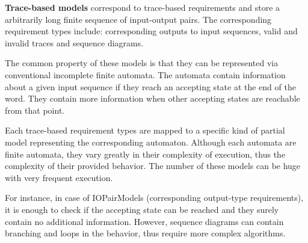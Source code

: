 
\textbf{Trace-based models} correspond to trace-based requirements and store a arbitrarily long finite sequence of input-output pairs. The corresponding requirement types include: corresponding outputs to input sequences, valid and invalid traces and sequence diagrams. 

The common property of these models is that they can be represented via conventional incomplete finite automata. The automata contain information about a given input sequence if they reach an accepting state at the end of the word. They contain more information when other accepting states are reachable from that point.

Each trace-based requirement types are mapped to a specific kind of partial model representing the corresponding automaton. Although each automata are finite automata, they vary greatly in their complexity of execution, thus the complexity of their provided behavior. The number of these models can be huge with very frequent execution.

For instance, in case of IOPairModels (corresponding output-type requirements), it is enough to check if the accepting state can be reached and they surely contain no additional information. However, sequence diagrams can contain branching and loops in the behavior, thus require more complex algorithms.




